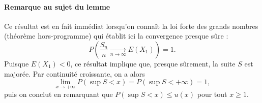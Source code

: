 \paragraph{Remarque au sujet du lemme}

Ce résultat est en fait immédiat lorsqu'on connaît la loi forte des grands nombres (théorème hors-programme) qui établit ici la convergence presque sûre :
\[
P\left(\frac{S_n}{n} \xrightarrow[n\to\infty]{} E(X_1)\right) = 1.
\]
Puisque $E(X_1) < 0$, ce résultat implique que, presque sûrement, la suite $S$ est majorée. Par continuité croissante, on a alors
\[
\lim_{x\to+\infty} P(\sup S < x) = P(\sup S < +\infty) = 1,
\]
puis on conclut en remarquant que $P(\sup S < x) \leqslant u(x)$ pour tout $x \geqslant 1$.


